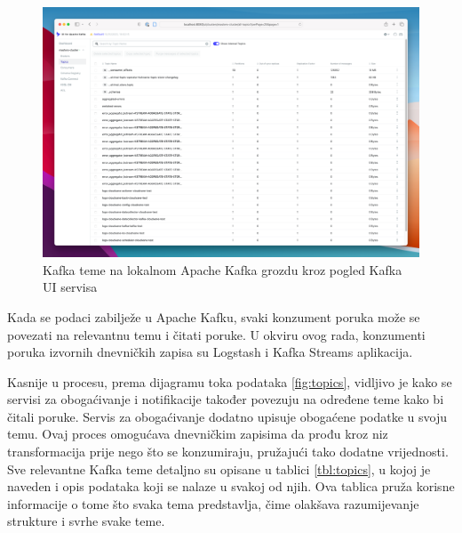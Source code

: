 \documentclass[times, utf8, diplomski]{fer}
\begin{document}
\begin{figure}[htb]
	\centering
	\includegraphics[width=15cm]{images/kafka-ui.png}
	\caption[Kafka teme na lokalnom Apache Kafka grozdu kroz pogled Kafka UI servisa]{Kafka teme  na lokalnom Apache Kafka grozdu kroz pogled Kafka UI servisa}
	\label{fig:kafkaui}
\end{figure}

Kada se podaci zabilježe u Apache Kafku, svaki konzument poruka može se povezati na relevantnu temu i čitati poruke. U okviru ovog rada, konzumenti poruka izvornih dnevničkih zapisa su Logstash i Kafka Streams aplikacija.

Kasnije u procesu, prema dijagramu toka podataka \ref{fig:topics}, vidljivo je kako se servisi za obogaćivanje i notifikacije također povezuju na određene teme kako bi čitali poruke. Servis za obogaćivanje dodatno upisuje obogaćene podatke u svoju temu. Ovaj proces omogućava dnevničkim zapisima da prođu kroz niz transformacija prije nego što se konzumiraju, pružajući tako dodatne vrijednosti.\\

Sve relevantne Kafka teme detaljno su opisane u tablici \ref{tbl:topics}, u kojoj je naveden i opis podataka koji se nalaze u svakoj od njih. Ova tablica pruža korisne informacije o tome što svaka tema predstavlja, čime olakšava razumijevanje strukture i svrhe svake teme.
\end{document}
